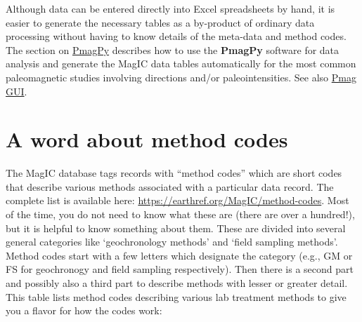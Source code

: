 \documentclass[11pt]{book}
\begin{document}
{{Although data can be entered directly into Excel spreadsheets by hand, it is easier to generate the necessary tables as a by-product of ordinary data processing without having to know details of the meta-data and method codes.
The section on \href{#PmagPy}{PmagPy} describes how to use the {\bf PmagPy} software for  data analysis and generate the MagIC data tables automatically for the most common paleomagnetic studies involving directions and/or paleointensities.    See also \href{#pmag_gui.py}{Pmag GUI}.



  \section{A word about  method codes}

  The MagIC database tags records with ``method codes'' which are short codes that describe various methods associated with a particular data record.  The complete list is available here:  \url{https://earthref.org/MagIC/method-codes}.      Most of the time, you do not need to know what these are (there are over a hundred!), but it is helpful to know something about them.  These are divided into several general categories like `geochronology methods' and  `field sampling methods'.   Method codes start with a few letters which designate the category (e.g., GM or FS  for geochronogy and field sampling respectively).   Then there is a second part and possibly also a third part to describe methods with lesser or greater detail.
This table lists method codes describing various lab treatment methods to give you a flavor for how the codes work:

}}
\end{document}
